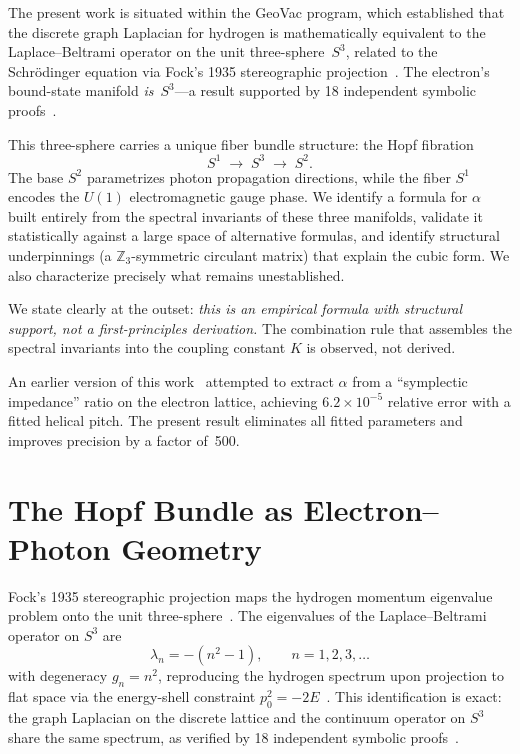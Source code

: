 \documentclass[aps,prl,twocolumn,superscriptaddress]{revtex4-2}
\begin{document}
The present work is situated within the GeoVac program, which
established that the discrete graph Laplacian for hydrogen is
mathematically equivalent to the Laplace--Beltrami operator on the
unit three-sphere~$S^3$, related to the Schr\"odinger equation via
Fock's 1935 stereographic projection~\cite{paper7}. The electron's
bound-state manifold \textit{is}~$S^3$---a result supported by 18
independent symbolic proofs~\cite{paper7}.

This three-sphere carries a unique fiber bundle structure: the Hopf
fibration~\cite{hopf1931,urbantke2003}
\begin{equation}\label{eq:hopf}
  S^1 \;\longrightarrow\; S^3 \;\longrightarrow\; S^2.
\end{equation}
The base $S^2$ parametrizes photon propagation directions, while the
fiber $S^1$ encodes the $U(1)$ electromagnetic gauge phase. We
identify a formula for $\alpha$ built entirely from the spectral
invariants of these three manifolds, validate it statistically against
a large space of alternative formulas, and identify structural
underpinnings (a $\mathbb{Z}_3$-symmetric circulant matrix) that
explain the cubic form. We also characterize precisely what remains
unestablished.

We state clearly at the outset: \textit{this is an empirical formula
with structural support, not a first-principles derivation.} The
combination rule that assembles the spectral invariants into the
coupling constant $K$ is observed, not derived.

An earlier version of this work~\cite{paper2_old} attempted to extract
$\alpha$ from a ``symplectic impedance'' ratio on the electron
lattice, achieving $6.2 \times 10^{-5}$ relative error with a fitted
helical pitch. The present result eliminates all fitted parameters and
improves precision by a factor of~500.


\section{The Hopf Bundle as Electron--Photon Geometry}

Fock's 1935 stereographic projection maps the hydrogen momentum
eigenvalue problem onto the unit three-sphere~\cite{fock1935}. The
eigenvalues of the Laplace--Beltrami operator on $S^3$ are
\begin{equation}\label{eq:s3eig}
  \lambda_n = -(n^2 - 1), \qquad n = 1, 2, 3, \ldots
\end{equation}
with degeneracy $g_n = n^2$, reproducing the hydrogen spectrum upon
projection to flat space via the energy-shell constraint
$p_0^2 = -2E$~\cite{paper7}. This identification is exact: the graph
Laplacian on the discrete lattice and the continuum operator on $S^3$
share the same spectrum, as verified by 18 independent symbolic
proofs~\cite{paper7}.
\end{document}
